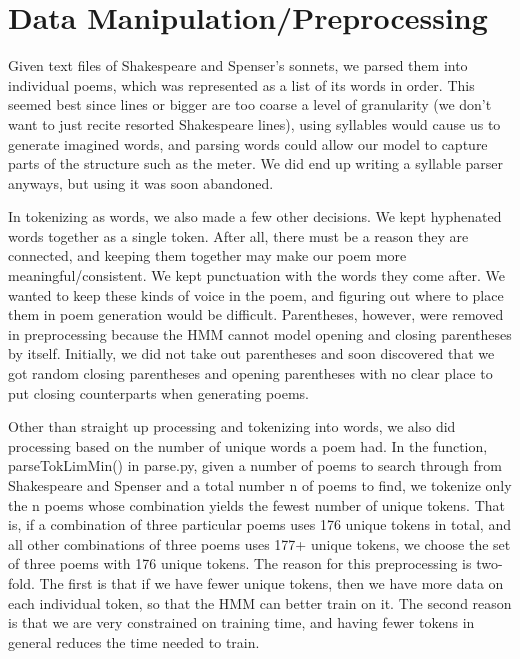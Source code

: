 \section{Data Manipulation/Preprocessing}
Given text files of Shakespeare and Spenser's sonnets, we parsed them into individual poems, which was represented as a list of its words in order. This seemed best since lines or bigger are too coarse a level of granularity (we don't want to just recite resorted Shakespeare lines), using syllables would cause us to generate imagined words, and parsing words could allow our model to capture parts of the structure such as the meter. We did end up writing a syllable parser anyways, but using it was soon abandoned.
\par In tokenizing as words, we also made a few other decisions. We kept hyphenated words together as a single token. After all, there must be a reason they are connected, and keeping them together may make our poem more meaningful/consistent. We kept punctuation with the words they come after. We wanted to keep these kinds of voice in the poem, and figuring out where to place them in poem generation would be difficult. Parentheses, however, were removed in preprocessing because the HMM cannot model opening and closing parentheses by itself. Initially, we did not take out parentheses and soon discovered that we got random closing parentheses and opening parentheses with no clear place to put closing counterparts when generating poems.
\par Other than straight up processing and tokenizing into words, we also did processing based on the number of unique words a poem had. In the function, parseTokLimMin() in parse.py, given a number of poems to search through from Shakespeare and Spenser and a total number n of poems to find, we tokenize  only the n poems whose combination yields the fewest number of unique tokens. That is, if a combination of three particular poems uses 176 unique tokens in total, and all other combinations of three poems uses 177+ unique tokens, we choose the set of three poems with 176 unique tokens. The reason for this preprocessing is two-fold. The first is that if we have fewer unique tokens, then we have more data on each individual token, so that the HMM can better train on it. The second reason is that we are very constrained on training time, and having fewer tokens in general reduces the time needed to train.

